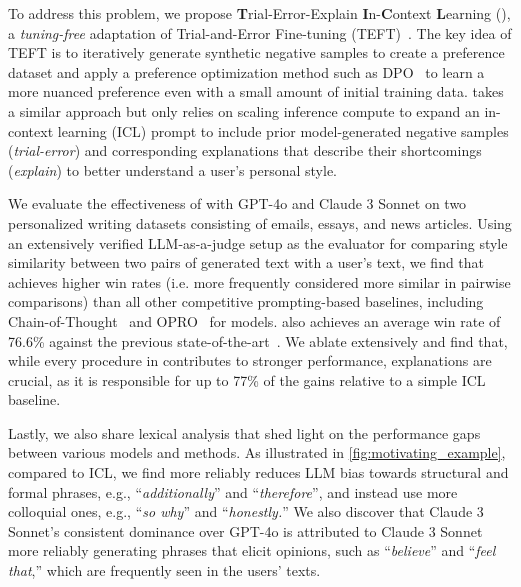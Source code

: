 To address this problem, we propose \textbf{T}rial-Error-Explain \textbf{I}n-\textbf{C}ontext \textbf{L}earning (\textbf{\ours}), a \textit{tuning-free} adaptation of Trial-and-Error Fine-tuning (TEFT)~\cite{shaikh2024show,gulcehre2023reinforced,song-etal-2024-trial}.
The key idea of TEFT is to iteratively generate synthetic negative samples to create a preference dataset and apply a preference optimization method such as DPO~\cite{rafailov2024direct} to learn a more nuanced preference even with a small amount of initial training data. 
\ours takes a similar approach but only relies on scaling inference compute to expand an in-context learning (ICL) prompt to include prior model-generated negative samples (\textit{trial-error}) and corresponding explanations that describe their shortcomings (\textit{explain}) to better understand a user's personal style. 

We evaluate the effectiveness of \ours with GPT-4o and Claude 3 Sonnet on two personalized writing datasets consisting of emails, essays, and news articles.  
Using an extensively verified LLM-as-a-judge setup as the evaluator for comparing style similarity between two pairs of generated text with a user's text, we find that \ours achieves higher win rates (i.e. more frequently considered more similar in pairwise comparisons) than all other competitive prompting-based baselines, including Chain-of-Thought~\cite{wei2022chain} and OPRO~\cite{yang2024large} for models. 
\ours also achieves an average win rate of 76.6\% against the previous state-of-the-art~\cite{shaikh2024show}.
We ablate \ours extensively and find that, while every procedure in \ours contributes to stronger performance, explanations are crucial, as it is responsible for up to 77\% of the gains relative to a simple ICL baseline.

Lastly, we also share lexical analysis that shed light on the performance gaps between various models and methods. 
As illustrated in \autoref{fig:motivating_example}, compared to ICL,
we find \ours more reliably reduces LLM bias towards structural and formal phrases, e.g.,  ``\textit{additionally}'' and ``\textit{therefore}'', and instead use more colloquial ones, e.g., ``\textit{so why}'' and ``\textit{honestly.}'' 
We also discover that Claude 3 Sonnet's consistent dominance over GPT-4o is attributed to Claude 3 Sonnet more reliably generating phrases that elicit opinions, such as ``\textit{believe}'' and ``\textit{feel that},'' which are frequently seen in the users' texts. 




